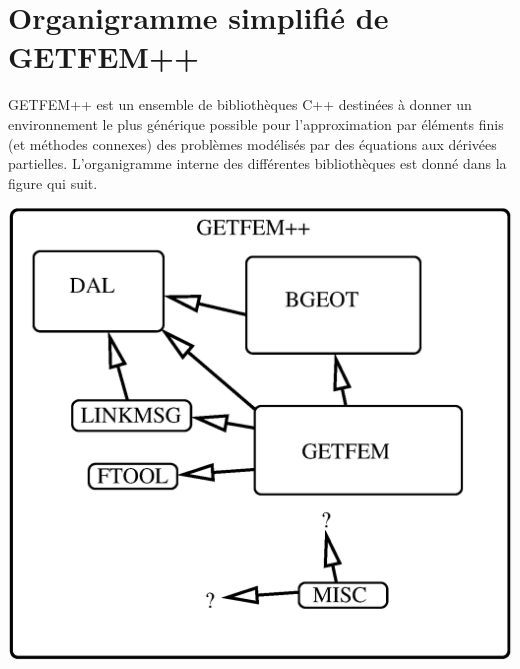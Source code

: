 \documentclass[12pt,a4paper]{../doc}
\begin{document}
{\section{Organigramme simplifi\'e de GETFEM++}
GETFEM++ est un ensemble de biblioth\`eques C++ destin\'ees \`a donner un environnement le plus g\'en\'erique possible pour l'approximation par \'el\'ements finis (et m\'ethodes connexes) des probl\`emes mod\'elis\'es par des \'equations aux d\'eriv\'ees partielles. L'organigramme interne des diff\'erentes biblioth\`eques est donn\'e dans la figure qui suit.

\begin{center}
\includegraphics[width=17cm,angle=0]{getfem_orga.eps}
\end{center}

}
\end{document}

